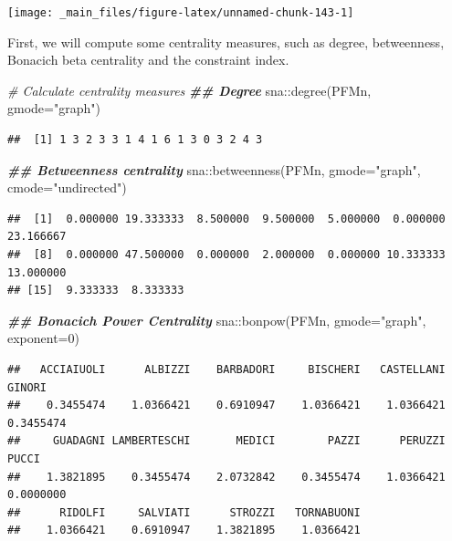 \documentclass[
  notitlepage,
  onecolumn,
  openany]{book}
\newenvironment{Shaded}{\begin{snugshade}}{\end{snugshade}}
\newcommand{\AttributeTok}[1]{\textcolor[rgb]{0.77,0.63,0.00}{#1}}
\newcommand{\CommentTok}[1]{\textcolor[rgb]{0.56,0.35,0.01}{\textit{#1}}}
\newcommand{\DecValTok}[1]{\textcolor[rgb]{0.00,0.00,0.81}{#1}}
\newcommand{\DocumentationTok}[1]{\textcolor[rgb]{0.56,0.35,0.01}{\textbf{\textit{#1}}}}
\newcommand{\FunctionTok}[1]{\textcolor[rgb]{0.00,0.00,0.00}{#1}}
\newcommand{\NormalTok}[1]{#1}
\newcommand{\SpecialCharTok}[1]{\textcolor[rgb]{0.00,0.00,0.00}{#1}}
\newcommand{\StringTok}[1]{\textcolor[rgb]{0.31,0.60,0.02}{#1}}
\begin{document}
\begin{center}\texttt{[image: \_main\_files/figure-latex/unnamed-chunk-143-1]} \end{center}

First, we will compute some centrality measures, such as degree, betweenness, Bonacich beta centrality and the constraint index.

\begin{Shaded}
\begin{Highlighting}[]
\CommentTok{\# Calculate centrality measures}
\DocumentationTok{\#\# Degree}
\NormalTok{sna}\SpecialCharTok{::}\FunctionTok{degree}\NormalTok{(PFMn, }\AttributeTok{gmode=}\StringTok{"graph"}\NormalTok{)}
\end{Highlighting}
\end{Shaded}

\begin{verbatim}
##  [1] 1 3 2 3 3 1 4 1 6 1 3 0 3 2 4 3
\end{verbatim}

\begin{Shaded}
\begin{Highlighting}[]
\DocumentationTok{\#\# Betweenness centrality}
\NormalTok{sna}\SpecialCharTok{::}\FunctionTok{betweenness}\NormalTok{(PFMn, }\AttributeTok{gmode=}\StringTok{"graph"}\NormalTok{, }\AttributeTok{cmode=}\StringTok{"undirected"}\NormalTok{)}
\end{Highlighting}
\end{Shaded}

\begin{verbatim}
##  [1]  0.000000 19.333333  8.500000  9.500000  5.000000  0.000000 23.166667
##  [8]  0.000000 47.500000  0.000000  2.000000  0.000000 10.333333 13.000000
## [15]  9.333333  8.333333
\end{verbatim}

\begin{Shaded}
\begin{Highlighting}[]
\DocumentationTok{\#\# Bonacich Power Centrality}
\NormalTok{sna}\SpecialCharTok{::}\FunctionTok{bonpow}\NormalTok{(PFMn, }\AttributeTok{gmode=}\StringTok{"graph"}\NormalTok{, }\AttributeTok{exponent=}\DecValTok{0}\NormalTok{)}
\end{Highlighting}
\end{Shaded}

\begin{verbatim}
##   ACCIAIUOLI      ALBIZZI    BARBADORI     BISCHERI   CASTELLANI       GINORI 
##    0.3455474    1.0366421    0.6910947    1.0366421    1.0366421    0.3455474 
##     GUADAGNI LAMBERTESCHI       MEDICI        PAZZI      PERUZZI        PUCCI 
##    1.3821895    0.3455474    2.0732842    0.3455474    1.0366421    0.0000000 
##      RIDOLFI     SALVIATI      STROZZI   TORNABUONI 
##    1.0366421    0.6910947    1.3821895    1.0366421
\end{verbatim}
\end{document}
